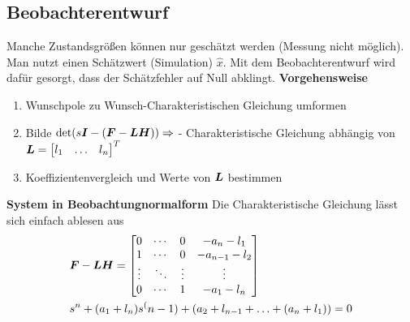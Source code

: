 \subsection{Beobachterentwurf}
\begin{tcolorbox}[colback=white!10!white,colframe=green!30!black] 
    Manche Zustandsgrößen können nur geschätzt werden (Messung nicht möglich). Man nutzt einen Schätzwert (Simulation) $\hat{x}$. Mit dem Beobachterentwurf wird dafür gesorgt, dass der Schätzfehler auf Null abklingt.
        \textbf{Vorgehensweise}
        \begin{enumerate}
            \item Wunschpole zu Wunsch-Charakteristischen Gleichung umformen
            \item Bilde $\det(s\boldsymbol{I}-(\boldsymbol{F}-\boldsymbol{LH}))\Rightarrow$ - Charakteristische Gleichung abhängig von $\boldsymbol{L} = \begin{bmatrix}
            l_1&\ldots&l_n
            \end{bmatrix}^T$ 
            \item Koeffizientenvergleich und Werte von $\boldsymbol{L}$ bestimmen
        \end{enumerate}
    \tcblower
\textbf{System in Beobachtungnormalform}
Die Charakteristische Gleichung lässt sich einfach ablesen aus
\begin{align*}
    &\boldsymbol{F}-\boldsymbol{LH} = 
    \begin{bmatrix}
    0 &  \cdots & 0 &-a_n-l_1\\
    1 &\cdots & 0 & -a_{n-1}-l_2 \\
    \vdots&\ddots&\vdots&\vdots\\
    0&\cdots&1&-a_1-l_n
    \end{bmatrix}    \\
    &s^n +(a_1+l_n)s^(n-1)+ (a_2+l_{n-1}+\ldots+(a_n+l_1))=0
\end{align*}


\end{tcolorbox}
